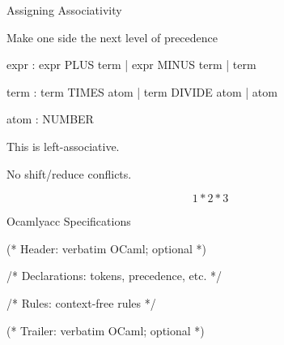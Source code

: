 \documentclass{plt}
\begin{document}
\begin{frame}[fragile]{Assigning Associativity}

Make one side the next level of precedence

\begin{ocamlyacc}
expr : expr PLUS term  
     | expr MINUS term 
     | term            

term : term TIMES atom 
     | term DIVIDE atom
     | atom            

atom  : NUMBER         
\end{ocamlyacc}

This is left-associative.

No shift/reduce conflicts.

$$1 * 2 * 3$$

\end{frame}


%
%
%
%
%
%

\begin{frame}[fragile]{Ocamlyacc Specifications}

\begin{ocamlyacc}
  (* Header: verbatim OCaml; optional *)

  /* Declarations: tokens, precedence, etc. */


  /* Rules: context-free rules */


  (* Trailer: verbatim OCaml; optional *)

\end{ocamlyacc}

\end{frame}
\end{document}
